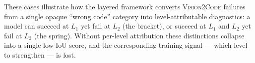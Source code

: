 These cases illustrate how the layered framework converts \textsc{Vision2Code} failures from a single opaque ``wrong code'' category into level-attributable diagnostics: a model can succeed at $L_1$ yet fail at $L_2$ (the bracket), or succeed at $L_1$ and $L_2$ yet fail at $L_3$ (the spring). Without per-level attribution these distinctions collapse into a single low IoU score, and the corresponding training signal --- which level to strengthen --- is lost.












